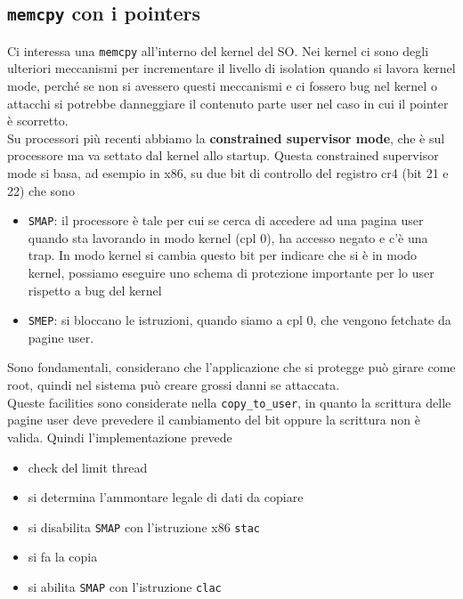 \documentclass[12pt, oneside]{extbook}
\begin{document}
\subsection{\texttt{memcpy} con i pointers}
Ci interessa una \texttt{memcpy} all'interno del kernel del SO. Nei kernel ci sono degli ulteriori meccanismi per incrementare il livello di isolation quando si lavora kernel mode, perché se non si avessero questi meccanismi e ci fossero bug nel kernel o attacchi si potrebbe danneggiare il contenuto parte user nel caso in cui il pointer è scorretto.\\Su processori più recenti abbiamo la \textbf{constrained supervisor mode}, che è sul processore ma va settato dal kernel allo startup. Questa constrained supervisor mode si basa, ad esempio in x86, su due bit di controllo del registro cr4 (bit 21 e 22) che sono
\begin{itemize}
\item \texttt{SMAP}: il processore è tale per cui se cerca di accedere ad una pagina user quando sta lavorando in modo kernel (cpl 0), ha accesso negato e c'è una trap. In modo kernel si cambia questo bit per indicare che si è in modo kernel, possiamo eseguire uno schema di protezione importante per lo user rispetto a bug del kernel
\item \texttt{SMEP}: si bloccano le istruzioni, quando siamo a cpl 0, che vengono fetchate da pagine user.
\end{itemize}
Sono fondamentali, considerano che l'applicazione che si protegge può girare come root, quindi nel sistema può creare grossi danni se attaccata.\\Queste facilities sono considerate nella \texttt{copy\_to\_user}, in quanto la scrittura delle pagine user deve prevedere il cambiamento del bit oppure la scrittura non è valida. Quindi l'implementazione prevede
\begin{itemize}
\item check del limit thread
\item si determina l'ammontare legale di dati da copiare
\item si disabilita \texttt{SMAP} con l'istruzione x86 \texttt{stac}
\item si fa la copia
\item si abilita \texttt{SMAP} con l'istruzione \texttt{clac}
\end{itemize}
\end{document}
